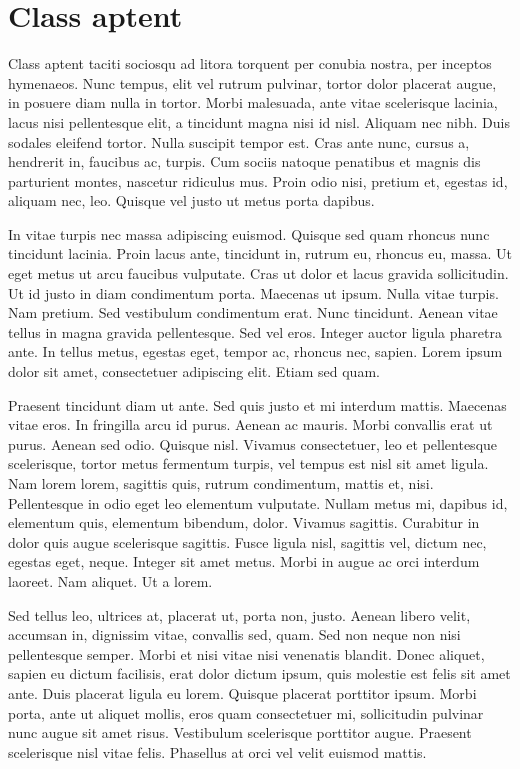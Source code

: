 \chapter{Class aptent}\label{app: ClassAptent}
Class aptent taciti sociosqu ad litora torquent per conubia nostra, per inceptos hymenaeos. Nunc tempus, elit vel rutrum pulvinar, tortor dolor placerat augue, in posuere diam nulla in tortor. Morbi malesuada, ante vitae scelerisque lacinia, lacus nisi pellentesque elit, a tincidunt magna nisi id nisl. Aliquam nec nibh. Duis sodales eleifend tortor. Nulla suscipit tempor est. Cras ante nunc, cursus a, hendrerit in, faucibus ac, turpis. Cum sociis natoque penatibus et magnis dis parturient montes, nascetur ridiculus mus. Proin odio nisi, pretium et, egestas id, aliquam nec, leo. Quisque vel justo ut metus porta dapibus. 

In vitae turpis nec massa adipiscing euismod. Quisque sed quam rhoncus nunc tincidunt lacinia. Proin lacus ante, tincidunt in, rutrum eu, rhoncus eu, massa. Ut eget metus ut arcu faucibus vulputate. Cras ut dolor et lacus gravida sollicitudin. Ut id justo in diam condimentum porta. Maecenas ut ipsum. Nulla vitae turpis. Nam pretium. Sed vestibulum condimentum erat. Nunc tincidunt. Aenean vitae tellus in magna gravida pellentesque. Sed vel eros. Integer auctor ligula pharetra ante. In tellus metus, egestas eget, tempor ac, rhoncus nec, sapien. Lorem ipsum dolor sit amet, consectetuer adipiscing elit. Etiam sed quam. 

Praesent tincidunt diam ut ante. Sed quis justo et mi interdum mattis. Maecenas vitae eros. In fringilla arcu id purus. Aenean ac mauris. Morbi convallis erat ut purus. Aenean sed odio. Quisque nisl. Vivamus consectetuer, leo et pellentesque scelerisque, tortor metus fermentum turpis, vel tempus est nisl sit amet ligula. Nam lorem lorem, sagittis quis, rutrum condimentum, mattis et, nisi. Pellentesque in odio eget leo elementum vulputate. Nullam metus mi, dapibus id, elementum quis, elementum bibendum, dolor. Vivamus sagittis. Curabitur in dolor quis augue scelerisque sagittis. Fusce ligula nisl, sagittis vel, dictum nec, egestas eget, neque. Integer sit amet metus. Morbi in augue ac orci interdum laoreet. Nam aliquet. Ut a lorem. 

Sed tellus leo, ultrices at, placerat ut, porta non, justo. Aenean libero velit, accumsan in, dignissim vitae, convallis sed, quam. Sed non neque non nisi pellentesque semper. Morbi et nisi vitae nisi venenatis blandit. Donec aliquet, sapien eu dictum facilisis, erat dolor dictum ipsum, quis molestie est felis sit amet ante. Duis placerat ligula eu lorem. Quisque placerat porttitor ipsum. Morbi porta, ante ut aliquet mollis, eros quam consectetuer mi, sollicitudin pulvinar nunc augue sit amet risus. Vestibulum scelerisque porttitor augue. Praesent scelerisque nisl vitae felis. Phasellus at orci vel velit euismod mattis.
